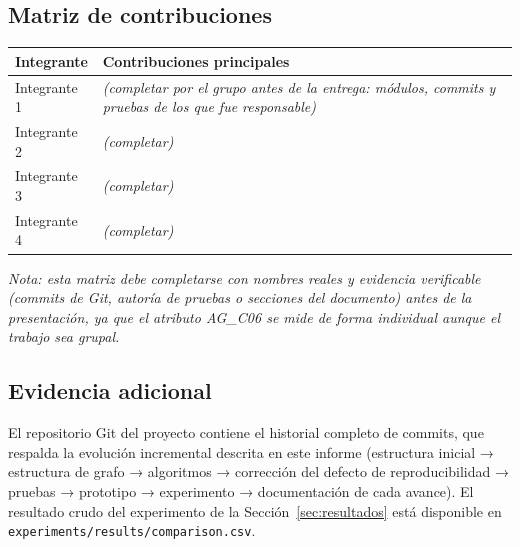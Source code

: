 \documentclass[11pt,a4paper]{article}
\begin{document}
\subsection{Matriz de contribuciones}
\begin{center}
\begin{tabular}{p{3.2cm}p{10.5cm}}
	\toprule
	\textbf{Integrante} & \textbf{Contribuciones principales} \\
	\midrule
	Integrante 1 & \emph{(completar por el grupo antes de la entrega: módulos, commits y
	pruebas de los que fue responsable)} \\
	Integrante 2 & \emph{(completar)} \\
	Integrante 3 & \emph{(completar)} \\
	Integrante 4 & \emph{(completar)} \\
	\bottomrule
\end{tabular}
\end{center}

\emph{Nota: esta matriz debe completarse con nombres reales y evidencia verificable
(commits de Git, autoría de pruebas o secciones del documento) antes de la presentación,
ya que el atributo AG\_C06 se mide de forma individual aunque el trabajo sea grupal.}

\subsection{Evidencia adicional}
El repositorio Git del proyecto contiene el historial completo de commits, que respalda la
evolución incremental descrita en este informe (estructura inicial → estructura de grafo →
algoritmos → corrección del defecto de reproducibilidad → pruebas → prototipo →
experimento → documentación de cada avance). El resultado crudo del experimento de la
Sección~\ref{sec:resultados} está disponible en
\texttt{experiments/results/comparison.csv}.
\end{document}
